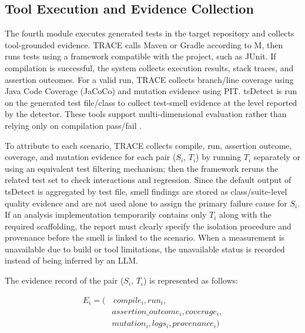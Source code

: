 \documentclass[pdflatex,sn-basic,Numbered,iicol]{sn-jnl}
\begin{document}
\subsection{Tool Execution and Evidence Collection}\label{subsec:tool-execution}

The fourth module executes generated tests in the target repository and collects tool-grounded evidence. TRACE calls Maven or Gradle according to M, then runs tests using a framework compatible with the project, such as JUnit. If compilation is successful, the system collects execution results, stack traces, and assertion outcomes. For a valid run, TRACE collects branch/line coverage using Java Code Coverage (JaCoCo) and mutation evidence using PIT. tsDetect is run on the generated test file/class to collect test-smell evidence at the level reported by the detector. These tools support multi-dimensional evaluation rather than relying only on compilation pass/fail \cite{bib35,bib33,bib34,bib25}.

To attribute to each scenario, TRACE collects compile, run, assertion outcome, coverage, and mutation evidence for each pair ($S_i$, $T_i$) by running $T_i$ separately or using an equivalent test filtering mechanism; then the framework reruns the related test set to check interactions and regression. Since the default output of tsDetect is aggregated by test file, smell findings are stored as class/suite-level quality evidence and are not used alone to assign the primary failure cause for $S_i$. If an analysis implementation temporarily contains only $T_i$ along with the required scaffolding, the report must clearly specify the isolation procedure and provenance before the smell is linked to the scenario. When a measurement is unavailable due to build or tool limitations, the unavailable status is recorded instead of being inferred by an LLM.

The evidence record of the pair ($S_i$, $T_i$) is represented as follows:

\begin{equation}
\begin{aligned}
E_i = (&\,compile_i, run_i,\\
&assertion\_outcome_i, coverage_i,\\
&mutation_i, logs_i, provenance_i)
\end{aligned}
\label{eq:evidence-record}
\end{equation}
\end{document}
